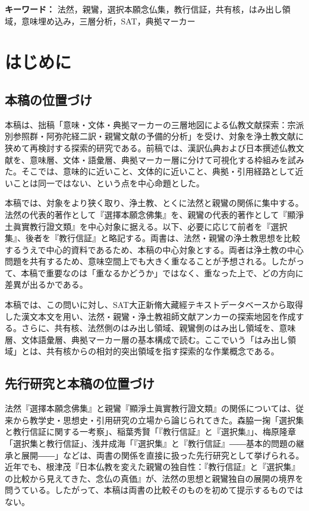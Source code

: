 \documentclass[uplatex,dvipdfmx,11pt,a4paper]{jsarticle}
\begin{document}
\noindent\textbf{キーワード：} 法然，親鸞，選択本願念仏集，教行信証，共有核，はみ出し領域，意味埋め込み，三層分析，SAT，典拠マーカー

\section{はじめに}

\subsection{本稿の位置づけ}

本稿は、拙稿「意味・文体・典拠マーカーの三層地図による仏教文献探索：宗派別参照群・阿弥陀経二訳・親鸞文献の予備的分析」\cite{ueyama2026three-layer-map}を受け、対象を浄土教文献に狭めて再検討する探索的研究である。前稿では、漢訳仏典および日本撰述仏教文献を、意味層、文体・語彙層、典拠マーカー層に分けて可視化する枠組みを試みた。そこでは、意味的に近いこと、文体的に近いこと、典拠・引用経路として近いことは同一ではない、という点を中心命題とした。

本稿では、対象をより狭く取り、浄土教、とくに法然と親鸞の関係に集中する。法然の代表的著作として『選擇本願念佛集』を、親鸞の代表的著作として『顯淨土眞實教行證文類』を中心対象に据える。以下、必要に応じて前者を『選択集』、後者を『教行信証』と略記する。両書は、法然・親鸞の浄土教思想を比較するうえで中心的資料であるため、本稿の中心対象とする。両者は浄土教の中心問題を共有するため、意味空間上でも大きく重なることが予想される。したがって、本稿で重要なのは「重なるかどうか」ではなく、重なった上で、どの方向に差異が出るかである。

本稿では、この問いに対し、SAT大正新脩大藏經テキストデータベースから取得した漢文本文を用い、法然・親鸞・浄土教祖師文献アンカーの探索地図を作成する。さらに、共有核、法然側のはみ出し領域、親鸞側のはみ出し領域を、意味層、文体語彙層、典拠マーカー層の基本構成で読む。ここでいう「はみ出し領域」とは、共有核からの相対的突出領域を指す探索的な作業概念である。

\subsection{先行研究と本稿の位置づけ}

法然『選擇本願念佛集』と親鸞『顯淨土眞實教行證文類』の関係については、従来から教学史・思想史・引用研究の立場から論じられてきた。森脇一掬「選択集と教行信証に関する一考察」\cite{moriwaki1953}、稲葉秀賢「『教行信証』と『選択集』」\cite{inaba1972}、梅原隆章「選択集と教行信証」\cite{umehara1974}、浅井成海「『選択集』と『教行信証』――基本的問題の継承と展開――」\cite{asai2004}などは、両書の関係を直接に扱った先行研究として挙げられる。近年でも、根津茂『日本仏教を変えた親鸞の独自性：『教行信証』と『選択集』の比較から見えてきた、念仏の真価』が、法然の思想と親鸞独自の展開の境界を問うている\cite{nezu2024}。したがって、本稿は両書の比較そのものを初めて提示するものではない。
\end{document}
